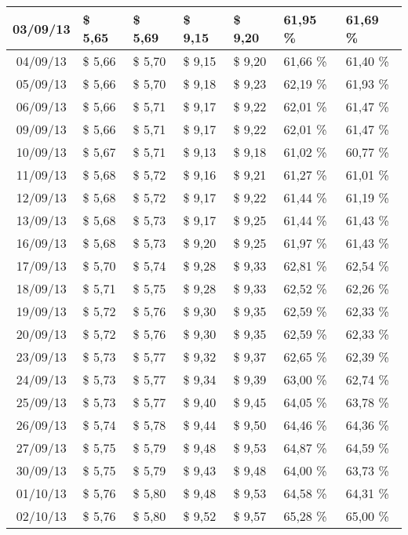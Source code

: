 \begin{center}
\begin{longtable}{|c|p{1.5cm}|p{1.5cm}|p{1.5cm}|p{1.5cm}|p{1.5cm}|p{1.5cm}|}
03/09/13 & \$ 5,65 & \$ 5,69 & \$ 9,15 & \$ 9,20 & 61,95 \% & 61,69 \% \\ \hline
04/09/13 & \$ 5,66 & \$ 5,70 & \$ 9,15 & \$ 9,20 & 61,66 \% & 61,40 \% \\ \hline
05/09/13 & \$ 5,66 & \$ 5,70 & \$ 9,18 & \$ 9,23 & 62,19 \% & 61,93 \% \\ \hline
06/09/13 & \$ 5,66 & \$ 5,71 & \$ 9,17 & \$ 9,22 & 62,01 \% & 61,47 \% \\ \hline
09/09/13 & \$ 5,66 & \$ 5,71 & \$ 9,17 & \$ 9,22 & 62,01 \% & 61,47 \% \\ \hline
10/09/13 & \$ 5,67 & \$ 5,71 & \$ 9,13 & \$ 9,18 & 61,02 \% & 60,77 \% \\ \hline
11/09/13 & \$ 5,68 & \$ 5,72 & \$ 9,16 & \$ 9,21 & 61,27 \% & 61,01 \% \\ \hline
12/09/13 & \$ 5,68 & \$ 5,72 & \$ 9,17 & \$ 9,22 & 61,44 \% & 61,19 \% \\ \hline
13/09/13 & \$ 5,68 & \$ 5,73 & \$ 9,17 & \$ 9,25 & 61,44 \% & 61,43 \% \\ \hline
16/09/13 & \$ 5,68 & \$ 5,73 & \$ 9,20 & \$ 9,25 & 61,97 \% & 61,43 \% \\ \hline
17/09/13 & \$ 5,70 & \$ 5,74 & \$ 9,28 & \$ 9,33 & 62,81 \% & 62,54 \% \\ \hline
18/09/13 & \$ 5,71 & \$ 5,75 & \$ 9,28 & \$ 9,33 & 62,52 \% & 62,26 \% \\ \hline
19/09/13 & \$ 5,72 & \$ 5,76 & \$ 9,30 & \$ 9,35 & 62,59 \% & 62,33 \% \\ \hline
20/09/13 & \$ 5,72 & \$ 5,76 & \$ 9,30 & \$ 9,35 & 62,59 \% & 62,33 \% \\ \hline
23/09/13 & \$ 5,73 & \$ 5,77 & \$ 9,32 & \$ 9,37 & 62,65 \% & 62,39 \% \\ \hline
24/09/13 & \$ 5,73 & \$ 5,77 & \$ 9,34 & \$ 9,39 & 63,00 \% & 62,74 \% \\ \hline
25/09/13 & \$ 5,73 & \$ 5,77 & \$ 9,40 & \$ 9,45 & 64,05 \% & 63,78 \% \\ \hline
26/09/13 & \$ 5,74 & \$ 5,78 & \$ 9,44 & \$ 9,50 & 64,46 \% & 64,36 \% \\ \hline
27/09/13 & \$ 5,75 & \$ 5,79 & \$ 9,48 & \$ 9,53 & 64,87 \% & 64,59 \% \\ \hline
30/09/13 & \$ 5,75 & \$ 5,79 & \$ 9,43 & \$ 9,48 & 64,00 \% & 63,73 \% \\ \hline
01/10/13 & \$ 5,76 & \$ 5,80 & \$ 9,48 & \$ 9,53 & 64,58 \% & 64,31 \% \\ \hline
02/10/13 & \$ 5,76 & \$ 5,80 & \$ 9,52 & \$ 9,57 & 65,28 \% & 65,00 \% \\ \hline

\end{longtable}
\end{center}
